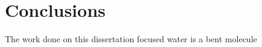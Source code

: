 \chapter{Conclusions} %

\label{Chapter6} %
The work done on this dissertation focused 
water is a bent molecule 